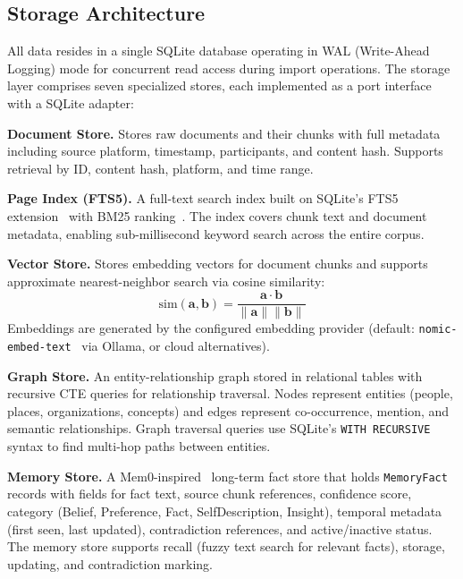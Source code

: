 \documentclass[manuscript,review]{acmart}
\begin{document}
\subsection{Storage Architecture}
\label{sec:storage}

All data resides in a single SQLite database operating in WAL (Write-Ahead Logging) mode for concurrent read access during import operations.
The storage layer comprises seven specialized stores, each implemented as a port interface with a SQLite adapter:

\textbf{Document Store.}
Stores raw documents and their chunks with full metadata including source platform, timestamp, participants, and content hash.
Supports retrieval by ID, content hash, platform, and time range.

\textbf{Page Index (FTS5).}
A full-text search index built on SQLite's FTS5 extension~\cite{sqlite2023fts5} with BM25 ranking~\cite{robertson2009bm25}.
The index covers chunk text and document metadata, enabling sub-millisecond keyword search across the entire corpus.

\textbf{Vector Store.}
Stores embedding vectors for document chunks and supports approximate nearest-neighbor search via cosine similarity:
\begin{equation}
\text{sim}(\mathbf{a}, \mathbf{b}) = \frac{\mathbf{a} \cdot \mathbf{b}}{\|\mathbf{a}\| \|\mathbf{b}\|}
\label{eq:cosine}
\end{equation}
Embeddings are generated by the configured embedding provider (default: \texttt{nomic-embed-text}~\cite{nussbaum2024nomic} via Ollama, or cloud alternatives).

\textbf{Graph Store.}
An entity-relationship graph stored in relational tables with recursive CTE queries for relationship traversal.
Nodes represent entities (people, places, organizations, concepts) and edges represent co-occurrence, mention, and semantic relationships.
Graph traversal queries use SQLite's \texttt{WITH RECURSIVE} syntax to find multi-hop paths between entities.

\textbf{Memory Store.}
A Mem0-inspired~\cite{chhikara2025mem0} long-term fact store that holds \texttt{MemoryFact} records with fields for fact text, source chunk references, confidence score, category (Belief, Preference, Fact, SelfDescription, Insight), temporal metadata (first seen, last updated), contradiction references, and active/inactive status.
The memory store supports recall (fuzzy text search for relevant facts), storage, updating, and contradiction marking.
\end{document}
